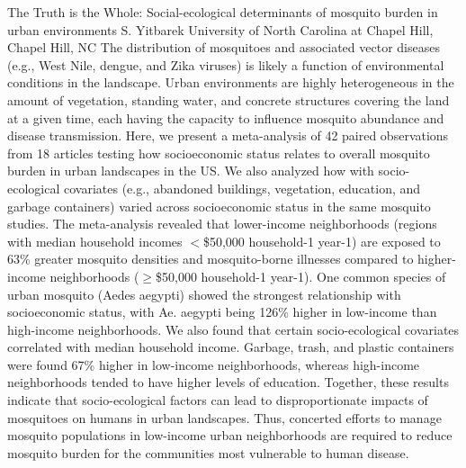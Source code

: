 
    \begin{abstract_online}{The Truth is the Whole: Social-ecological determinants of mosquito burden in urban environments}{%
        S. Yitbarek}{%
        }{%
        University of North Carolina at Chapel Hill, Chapel Hill, NC}
    The distribution of mosquitoes and associated vector diseases (e.g., West Nile, dengue, and Zika viruses) is likely a function of environmental conditions in the landscape. Urban environments are highly heterogeneous in the amount of vegetation, standing water, and concrete structures covering the land at a given time, each having the capacity to influence mosquito abundance and disease transmission. Here, we present a meta-analysis of 42 paired observations from 18 articles testing how socioeconomic status relates to overall mosquito burden in urban landscapes in the US. We also analyzed how with socio-ecological covariates (e.g., abandoned buildings, vegetation, education, and garbage containers) varied across socioeconomic status in the same mosquito studies. The meta-analysis revealed that lower-income neighborhoods (regions with median household incomes $<$\$50,000 household-1 year-1) are exposed to 63\% greater mosquito densities and mosquito-borne illnesses compared to higher-income neighborhoods ($\geq$\$50,000 household-1 year-1). One common species of urban mosquito (Aedes aegypti) showed the strongest relationship with socioeconomic status, with Ae. aegypti being 126\% higher in low-income than high-income neighborhoods. We also found that certain socio-ecological covariates correlated with median household income. Garbage, trash, and plastic containers were found 67\% higher in low-income neighborhoods, whereas high-income neighborhoods tended to have higher levels of education. Together, these results indicate that socio-ecological factors can lead to disproportionate impacts of mosquitoes on humans in urban landscapes. Thus, concerted efforts to manage mosquito populations in low-income urban neighborhoods are required to reduce mosquito burden for the communities most vulnerable to human disease. 
    
    \end{abstract_online}
    